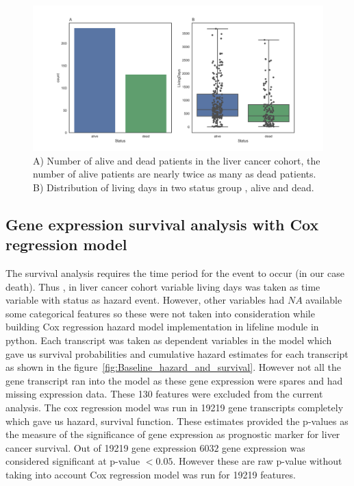 \documentclass[11pt]{article}
\begin{document}
\begin{figure}[bh]
    \centering
      \includegraphics[width=\textwidth]{Genderandstatus.png}
    \caption{A) Number of alive and dead patients in the liver cancer cohort, the number of alive patients are nearly twice as many as dead patients. B) Distribution of living days in two status group , alive and dead. \scriptsize}
    \label{fig:status_livingdays}
\end{figure}

 	
	\subsection {Gene expression survival analysis with Cox regression model }
	
	The survival analysis requires the time period for the event to occur (in our case death). Thus , in liver cancer cohort variable living days was taken as time variable with status as hazard event. However, other variables had $NA$ available  some categorical features so these were not taken into consideration while building Cox regression hazard model implementation in lifeline module in python. Each transcript was taken as dependent variables in the model which gave us survival probabilities and cumulative hazard estimates for each transcript as shown in the figure~\ref{fig:Baseline_hazard_and_survival}. However not all the gene transcript ran into the model as these gene expression were spares and had missing expression data. These 130 features were excluded from the current analysis.  The cox regression model was run in 19219 gene transcripts completely which gave us hazard, survival function. These estimates provided the p-values as the measure of the significance of gene expression as prognostic marker for  liver cancer survival. Out of 19219 gene expression $6032$ gene expression was considered significant at p-value $< 0.05$. However these are raw p-value without taking into account Cox regression model was run for 19219 features.   
	
\end{document}
